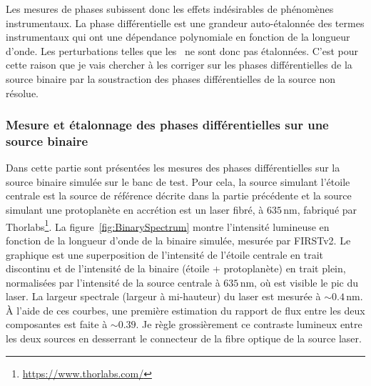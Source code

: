 Les mesures de phases subissent donc les effets indésirables de phénomènes instrumentaux. La phase différentielle est une grandeur auto-étalonnée des termes instrumentaux qui ont une dépendance polynomiale en fonction de la longueur d'onde. Les perturbations telles que les \wiggles~ne sont donc pas étalonnées. C'est pour cette raison que je vais chercher à les corriger sur les phases différentielles de la source binaire par la soustraction des phases différentielles de la source non résolue.


\subsubsection{Mesure et étalonnage des phases différentielles sur une source binaire}
\label{sec:PhaseDiffMesure}

Dans cette partie sont présentées les mesures des phases différentielles sur la source binaire simulée sur le banc de test. Pour cela, la source simulant l'étoile centrale est la source de référence décrite dans la partie précédente et la source simulant une protoplanète en accrétion est un laser fibré, à $635 \,$nm, fabriqué par Thorlabs\footnote{\url{https://www.thorlabs.com/}}. La figure~\ref{fig:BinarySpectrum} montre l'intensité lumineuse en fonction de la longueur d'onde de la binaire simulée, mesurée par \ac{FIRSTv2}. Le graphique est une superposition de l'intensité de l'étoile centrale en trait discontinu et de l'intensité de la binaire (étoile + protoplanète) en trait plein, normalisées par l'intensité de la source centrale à $635 \,$nm, où est visible le pic du laser. La largeur spectrale (largeur à mi-hauteur) du laser est mesurée à $\sim 0.4 \,$nm. À l'aide de ces courbes, une première estimation du rapport de flux entre les deux composantes est faite à $\sim 0.39$. Je règle grossièrement ce contraste lumineux entre les deux sources en desserrant le connecteur de la fibre optique de la source laser.

